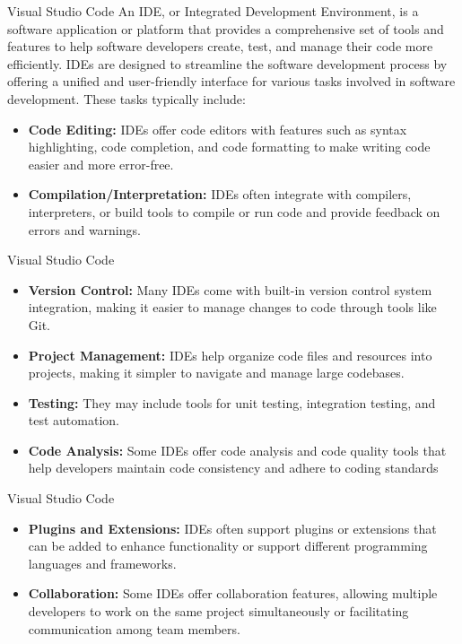 \begin{frame}
    \begin{content}{Visual Studio Code}
        An IDE, or Integrated Development Environment, is a software application or platform that provides a comprehensive set of tools and features to help software developers create, test, and manage their code more efficiently. IDEs are designed to streamline the software development process by offering a unified and user-friendly interface for various tasks involved in software development. These tasks typically include:
        \begin{itemize}
            \item \textbf{Code Editing:} IDEs offer code editors with features such as syntax highlighting, code completion, and code formatting to make writing code easier and more error-free.
            \item \textbf{Compilation/Interpretation:} IDEs often integrate with compilers, interpreters, or build tools to compile or run code and provide feedback on errors and warnings.
        \end{itemize}
    \end{content}
\end{frame}

\begin{frame}
    \begin{content}{Visual Studio Code}
        \begin{itemize}
            \item \textbf{Version Control:} Many IDEs come with built-in version control system integration, making it easier to manage changes to code through tools like Git.
            \item \textbf{Project Management:} IDEs help organize code files and resources into projects, making it simpler to navigate and manage large codebases.
            \item \textbf{Testing:} They may include tools for unit testing, integration testing, and test automation.
            \item \textbf{Code Analysis:} Some IDEs offer code analysis and code quality tools that help developers maintain code consistency and adhere to coding standards
        \end{itemize}
    \end{content}
\end{frame}

\begin{frame}
    \begin{content}{Visual Studio Code}
        \begin{itemize}
            \item \textbf{Plugins and Extensions:} IDEs often support plugins or extensions that can be added to enhance functionality or support different programming languages and frameworks.
            \item \textbf{Collaboration:} Some IDEs offer collaboration features, allowing multiple developers to work on the same project simultaneously or facilitating communication among team members.
        \end{itemize}
    \end{content}
\end{frame}

